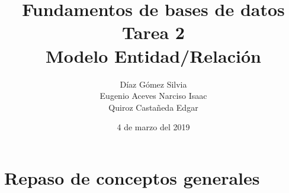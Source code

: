 \documentclass{article}
\begin{document}
    \title{
        Fundamentos de bases de datos \\
        Tarea 2 \\
        Modelo Entidad/Relación
    }
    \author{
        Díaz Gómez Silvia \\
        Eugenio Aceves Narciso Isaac \\
        Quiroz Castañeda Edgar
    }
    \date {
        4 de marzo del 2019    
    }
    \maketitle

    \section{Repaso de conceptos generales}
\end{document}
